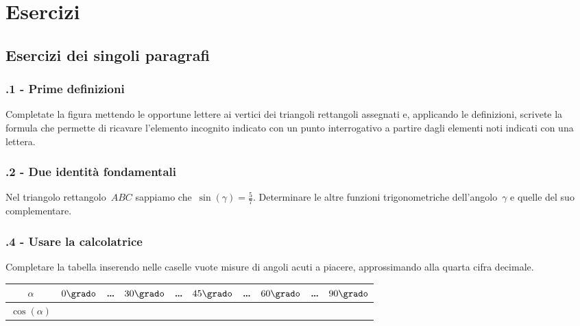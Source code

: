
\section{Esercizi}
\subsection{Esercizi dei singoli paragrafi}
\subsubsection*{\thechapter.1 - Prime definizioni}

\begin{esercizio}
\label{ese:G.1}
Completate la figura mettendo le opportune lettere ai vertici dei triangoli rettangoli assegnati e, applicando le definizioni, scrivete la formula
che permette di ricavare l'elemento incognito indicato con un punto interrogativo a partire dagli elementi noti indicati con una lettera.
\begin{center}
 
\end{center}

\end{esercizio}

\subsubsection*{\thechapter.2 - Due identità fondamentali}

\begin{esercizio}
\label{ese:G.2}
Nel triangolo rettangolo~$ABC$ sappiamo che~$\sin(\gamma)=\frac{5}{7}$.
Determinare le altre funzioni trigonometriche dell'angolo~$\gamma$ e quelle del suo complementare.
\end{esercizio}

\subsubsection*{\thechapter.4 - Usare la calcolatrice}

\begin{esercizio}
\label{ese:G.3}
Completare la tabella inserendo nelle caselle vuote misure di angoli acuti a piacere, approssimando alla quarta cifra decimale.
\begin{center}
\begin{tabular}{cccccccccc}
\toprule
$\alpha$ & $0\grado$ & \ldots & $30\grado$ & \ldots & $45\grado$ & \ldots & $60\grado$ & \ldots & $90\grado$\\
\midrule
$\cos(\alpha)$ & & & & & & & & & \\
\bottomrule
\end{tabular}
\end{center}
\end{esercizio}

